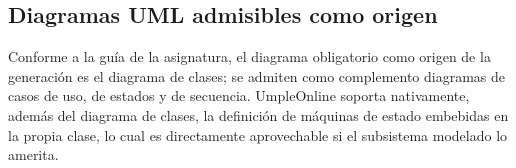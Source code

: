\documentclass[11pt,a4paper]{article}
\begin{document}
\subsection{Diagramas UML admisibles como origen}
Conforme a la gu\'ia de la asignatura, el diagrama obligatorio como origen de la generaci\'on es el diagrama de clases; se admiten como complemento diagramas de casos de uso, de estados y de secuencia. UmpleOnline soporta nativamente, adem\'as del diagrama de clases, la definici\'on de m\'aquinas de estado embebidas en la propia clase, lo cual es directamente aprovechable si el subsistema modelado lo amerita.
\end{document}
